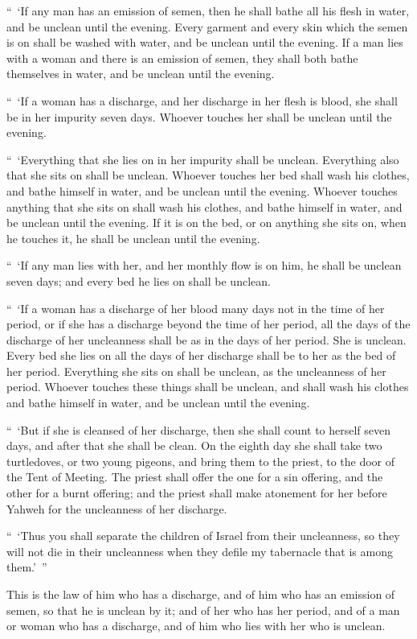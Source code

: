 {\par }{\PP {}“ ‘If any man has an emission of semen, then he shall bathe all his flesh in water, and be unclean until the evening.
Every garment and every skin which the semen is on shall be washed with water, and be unclean until the evening.
If a man lies with a woman and there is an emission of semen, they shall both bathe themselves in water, and be unclean until the evening.
\par }{\PP {}“ ‘If a woman has a discharge, and her discharge in her flesh is blood, she shall be in her impurity seven days. Whoever touches her shall be unclean until the evening.
\par }{\PP {}“ ‘Everything that she lies on in her impurity shall be unclean. Everything also that she sits on shall be unclean.
Whoever touches her bed shall wash his clothes, and bathe himself in water, and be unclean until the evening.
Whoever touches anything that she sits on shall wash his clothes, and bathe himself in water, and be unclean until the evening.
If it is on the bed, or on anything she sits on, when he touches it, he shall be unclean until the evening.
\par }{\PP {}“ ‘If any man lies with her, and her monthly flow is on him, he shall be unclean seven days; and every bed he lies on shall be unclean.
\par }{\PP {}“ ‘If a woman has a discharge of her blood many days not in the time of her period, or if she has a discharge beyond the time of her period, all the days of the discharge of her uncleanness shall be as in the days of her period. She is unclean.
Every bed she lies on all the days of her discharge shall be to her as the bed of her period. Everything she sits on shall be unclean, as the uncleanness of her period.
Whoever touches these things shall be unclean, and shall wash his clothes and bathe himself in water, and be unclean until the evening.
\par }{\PP {}“ ‘But if she is cleansed of her discharge, then she shall count to herself seven days, and after that she shall be clean.
On the eighth day she shall take two turtledoves, or two young pigeons, and bring them to the priest, to the door of the Tent of Meeting.
The priest shall offer the one for a sin offering, and the other for a burnt offering; and the priest shall make atonement for her before Yahweh for the uncleanness of her discharge.
\par }{\PP {}“ ‘Thus you shall separate the children of Israel from their uncleanness, so they will not die in their uncleanness when they defile my tabernacle that is among them.’ ”
\par }{\PP {}This is the law of him who has a discharge, and of him who has an emission of semen, so that he is unclean by it;
and of her who has her period, and of a man or woman who has a discharge, and of him who lies with her who is unclean.

}
